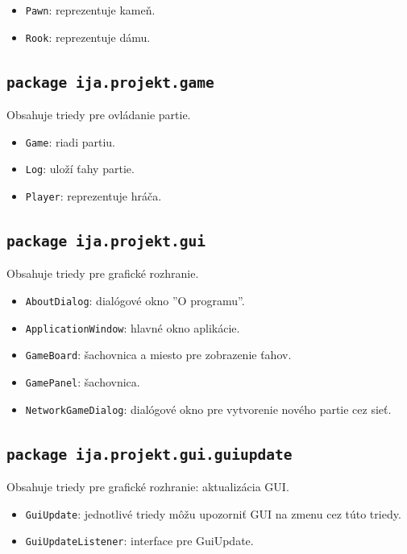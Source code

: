 \documentclass[12pt,a4paper,titlepage,final]{article}
\begin{document}
\begin{itemize}
\item \texttt{Pawn}: reprezentuje kameň.
\item \texttt{Rook}: reprezentuje dámu.
\end{itemize}

\subsection{\texttt{package ija.projekt.game}}
Obsahuje triedy pre ovládanie partie.

\begin{itemize}
\item \texttt{Game}: riadi partiu.
\item \texttt{Log}: uloží ťahy partie.
\item \texttt{Player}: reprezentuje hráča.
\end{itemize}

\subsection{\texttt{package ija.projekt.gui}}
Obsahuje triedy pre grafické rozhranie.

\begin{itemize}
\item \texttt{AboutDialog}: dialógové okno ''O programu''.
\item \texttt{ApplicationWindow}: hlavné okno aplikácie.
\item \texttt{GameBoard}: šachovnica a miesto pre zobrazenie ťahov.
\item \texttt{GamePanel}: šachovnica.
\item \texttt{NetworkGameDialog}: dialógové okno pre vytvorenie nového partie cez sieť.
\end{itemize}

\subsection{\texttt{package ija.projekt.gui.guiupdate}}
Obsahuje triedy pre grafické rozhranie: aktualizácia GUI.

\begin{itemize}
\item \texttt{GuiUpdate}: jednotlivé triedy môžu upozorniť GUI na zmenu cez túto triedy.
\item \texttt{GuiUpdateListener}: interface pre GuiUpdate.
\end{itemize}
\end{document}
